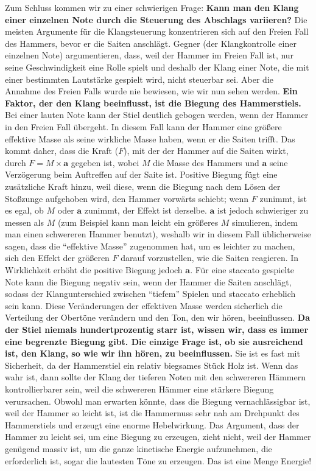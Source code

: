 Zum Schluss kommen wir zu einer schwierigen Frage: \textbf{Kann man den Klang einer einzelnen Note durch die Steuerung des Abschlags variieren?}
Die meisten Argumente für die Klangsteuerung konzentrieren sich auf den Freien Fall des Hammers, bevor er die Saiten anschlägt.
Gegner (der Klangkontrolle einer einzelnen Note) argumentieren, dass, weil der Hammer im Freien Fall ist, nur seine Geschwindigkeit eine Rolle spielt und deshalb der Klang einer Note, die mit einer bestimmten Lautstärke gespielt wird, nicht steuerbar sei.
Aber die Annahme des Freien Falls wurde nie bewiesen, wie wir nun sehen werden.
\textbf{Ein Faktor, der den Klang beeinflusst, ist die Biegung des Hammerstiels.}
Bei einer lauten Note kann der Stiel deutlich gebogen werden, wenn der Hammer in den Freien Fall übergeht.
In diesem Fall kann der Hammer eine größere effektive Masse als seine wirkliche Masse haben, wenn er die Saiten trifft.
Das kommt daher, dass die Kraft ($F$), mit der der Hammer auf die Saiten wirkt, durch $F = M\times\mathbf{a}$ gegeben ist, wobei $M$ die Masse des Hammers und $\mathbf{a}$ seine Verzögerung beim Auftreffen auf der Saite ist.
Positive Biegung fügt eine zusätzliche Kraft hinzu, weil diese, wenn die Biegung nach dem Lösen der Stoßzunge aufgehoben wird, den Hammer vorwärts schiebt; wenn $F$ zunimmt, ist es egal, ob $M$ oder $\mathbf{a}$ zunimmt, der Effekt ist derselbe.
$\mathbf{a}$ ist jedoch schwieriger zu messen als $M$ (zum Beispiel kann man leicht ein größeres $M$ simulieren, indem man einen schwereren Hammer benutzt), weshalb wir in diesem Fall üblicherweise sagen, dass die \enquote{effektive Masse} zugenommen hat, um es leichter zu machen, sich den Effekt der größeren $F$ darauf vorzustellen, wie die Saiten reagieren.
In Wirklichkeit erhöht die positive Biegung jedoch $\mathbf{a}$.
Für eine staccato gespielte Note kann die Biegung negativ sein, wenn der Hammer die Saiten anschlägt, sodass der Klangunterschied zwischen \enquote{tiefem} Spielen und staccato erheblich sein kann.
Diese Veränderungen der effektiven Masse werden sicherlich die Verteilung der Obertöne verändern und den Ton, den wir hören, beeinflussen.
\textbf{Da der Stiel niemals hundertprozentig starr ist, wissen wir, dass es immer eine begrenzte Biegung gibt.
Die einzige Frage ist, ob sie ausreichend ist, den Klang, so wie wir ihn hören, zu beeinflussen.}
Sie ist es fast mit Sicherheit, da der Hammerstiel ein relativ biegsames Stück Holz ist.
Wenn das wahr ist, dann sollte der Klang der tieferen Noten mit den schwereren Hämmern kontrollierbarer sein, weil die schwereren Hämmer eine stärkere Biegung verursachen.
Obwohl man erwarten könnte, dass die Biegung vernachlässigbar ist, weil der Hammer so leicht ist, ist die Hammernuss sehr nah am Drehpunkt des Hammerstiels und erzeugt eine enorme Hebelwirkung.
Das Argument, dass der Hammer zu leicht sei, um eine Biegung zu erzeugen, zieht nicht, weil der Hammer genügend massiv ist, um die ganze kinetische Energie aufzunehmen, die erforderlich ist, sogar die lautesten Töne zu erzeugen.
Das ist eine Menge Energie!

